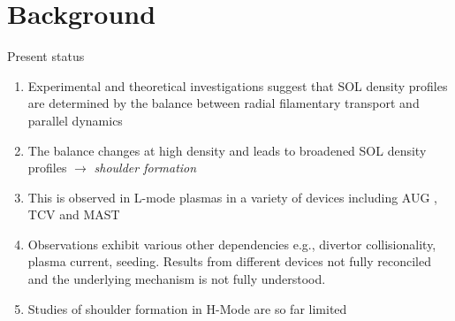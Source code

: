 \documentclass[10pt, compress]{beamer}
\begin{document}
\section{Background}
\begin{frame}{Present status}
  \begin{enumerate}[<+(1) | invisible@-+>]
    \item Experimental and theoretical investigations suggest that SOL density profiles are
      determined by the balance between radial filamentary transport and parallel dynamics
    \item The balance changes at high density and leads to broadened SOL density profiles $\rightarrow$ \emph{shoulder formation}
    \item This is observed in L-mode plasmas in a variety of devices including AUG \parencite{Carralero:2014gs},
      TCV \parencite{Garcia:2007p2615} and MAST \parencite{Militello:2016hk}
    \item Observations exhibit various other dependencies e.g., divertor
      collisionality, plasma current, seeding. \alert{Results from
        different devices not fully reconciled and the underlying mechanism is not fully understood.}
    \item Studies of shoulder formation in H-Mode are so far limited 
    \end{enumerate}
\end{frame}
\end{document}
